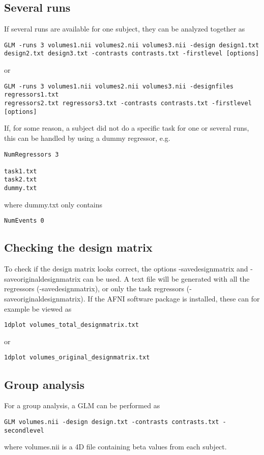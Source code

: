 \subsection{Several runs}

If several runs are available for one subject, they can be analyzed together as
\begin{verbatim}
GLM -runs 3 volumes1.nii volumes2.nii volumes3.nii -design design1.txt 
design2.txt design3.txt -contrasts contrasts.txt -firstlevel [options]
\end{verbatim}
or
\begin{verbatim}
GLM -runs 3 volumes1.nii volumes2.nii volumes3.nii -designfiles regressors1.txt 
regressors2.txt regressors3.txt -contrasts contrasts.txt -firstlevel [options]
\end{verbatim}
If, for some reason, a subject did not do a specific task for one or several runs, this can be handled by using a dummy regressor, e.g.
\begin{verbatim}
NumRegressors 3

task1.txt
task2.txt
dummy.txt
\end{verbatim}
where dummy.txt only contains
\begin{verbatim}
NumEvents 0
\end{verbatim}

\subsection{Checking the design matrix}

To check if the design matrix looks correct, the options -savedesignmatrix and -saveoriginaldesignmatrix can be used. A text file will be generated with all the regressors (-savedesignmatrix), or only the task regressors (-saveoriginaldesignmatrix). If the AFNI software package is installed, these can for example be viewed as

\begin{verbatim}
1dplot volumes_total_designmatrix.txt
\end{verbatim}
or
\begin{verbatim}
1dplot volumes_original_designmatrix.txt
\end{verbatim}

\subsection{Group analysis}

\noindent For a group analysis, a GLM can be performed as
\begin{verbatim}
GLM volumes.nii -design design.txt -contrasts contrasts.txt -secondlevel
\end{verbatim}
where volumes.nii is a 4D file containing beta values from each subject.

